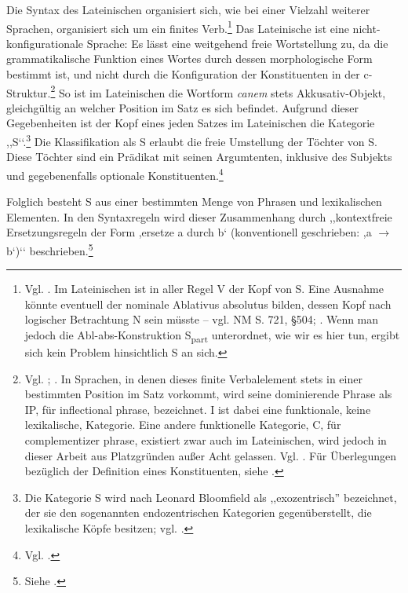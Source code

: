 \documentclass[12pt,a4paper]{article}
\begin{document}
Die Syntax des Lateinischen organisiert sich, wie bei einer Vielzahl weiterer Sprachen, organisiert sich um ein finites Verb.\footnote{Vgl. \cite[53]{Dal}. Im Lateinischen ist in aller Regel V der Kopf von S. Eine Ausnahme könnte eventuell der nominale Ablativus absolutus bilden, dessen Kopf nach logischer Betrachtung N sein müsste -- vgl. NM S. 721, §504; \cite[64]{Falk}. Wenn man jedoch die Abl-abs-Konstruktion S\textsubscript{part} unterordnet, wie wir es hier tun, ergibt sich kein Problem hinsichtlich S an sich.}
Das Lateinische ist eine nicht-konfigurationale Sprache: Es lässt eine weitgehend freie Wortstellung zu, da die grammatikalische Funktion eines Wortes durch dessen morphologische Form bestimmt ist, und nicht durch die Konfiguration der Konstituenten in der c-Struktur.\footnote{Vgl. \cite[19]{Rohrer}; \cite[65]{Dal}. In Sprachen, in denen dieses finite Verbalelement stets in einer bestimmten Position im Satz vorkommt, wird seine dominierende Phrase als IP, für inflectional phrase, bezeichnet. I ist dabei eine funktionale, keine lexikalische, Kategorie. Eine andere funktionelle Kategorie, C, für complementizer phrase, existiert zwar auch im Lateinischen, wird jedoch in dieser Arbeit aus Platzgründen außer Acht gelassen. Vgl. \cite[53; 65]{Dal}. Für Überlegungen bezüglich der Definition eines Konstituenten, siehe \cite[48-9]{Dal}.} So ist im Lateinischen die Wortform \textit{canem} stets Akkusativ-Objekt, gleichgültig an welcher Position im Satz es sich befindet. Aufgrund dieser Gegebenheiten ist der Kopf eines jeden Satzes im Lateinischen die Kategorie ,,S‘‘.\footnote{Die Kategorie S wird nach Leonard Bloomfield als ,,exozentrisch'' bezeichnet, der sie den sogenannten endozentrischen Kategorien gegenüberstellt, die lexikalische Köpfe besitzen; vgl. \cite[46]{Dal}.} Die Klassifikation als S erlaubt die freie Umstellung der Töchter von S. Diese Töchter sind ein Prädikat mit seinen Argumtenten, inklusive des Subjekts und gegebenenfalls optionale Konstituenten.\footnote{Vgl. \cite[64-65]{Dal}.}

Folglich besteht S aus einer bestimmten Menge von Phrasen und lexikalischen Elementen. In den Syntaxregeln wird dieser Zusammenhang durch ,,kontextfreie Ersetzungsregeln der Form ,ersetze a durch b‘ (konventionell geschrieben: ,a $\rightarrow$ b‘)‘‘ beschrieben.\footnote{Siehe \cite[18]{Rohrer}.}
\end{document}
